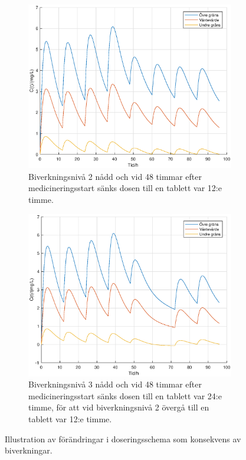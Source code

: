 \documentclass[a4paper,11pt]{article}
\begin{document}
\begin{figure}[H]
\centering
\begin{subfigure}[t]{.5\textwidth}
    \centering
    \includegraphics[scale=0.3]{fig5a.eps}
    \caption{Biverkningsnivå 2 nådd och vid 48 timmar efter medicineringsstart sänks dosen till en tablett var 12:e timme.}
    \label{fig5a}
\end{subfigure}%
\begin{subfigure}[t]{.5\textwidth}
    \centering
    \includegraphics[scale=0.3]{fig5b.eps}
    \caption{Biverkningsnivå 3 nådd och vid 48 timmar efter medicineringsstart sänks dosen till en tablett var 24:e timme, för att vid biverkningsnivå 2 övergå till en tablett var 12:e timme.}
    \label{fig5b}
\end{subfigure}
\caption{Illustration av förändringar i doseringsschema som konsekvens av biverkningar.}
\label{fig5}
\end{figure}
\end{document}
